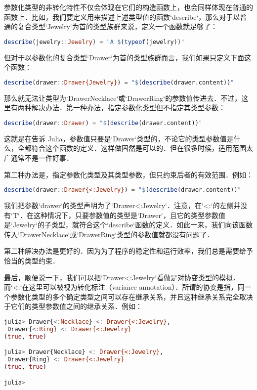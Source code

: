 参数化类型的非转化特性不仅会体现在它们的构造函数上，也会同样体现在普通的函数上．比如，我们要定义用来描述上述类型值的函数`describe`，那么对于以普通的复合类型`Jewelry`为首的类型族群来说，定义一个函数就足够了：

\begin{lstlisting}[language=julia]
describe(jewelry::Jewelry) = "A $(typeof(jewelry))"
\end{lstlisting}

但对于以参数化的复合类型`Drawer`为首的类型族群而言，我们如果只定义下面这个函数：

\begin{lstlisting}[language=julia]
describe(drawer::Drawer{Jewelry}) = "$(describe(drawer.content))"
\end{lstlisting}

那么就无法让类型为`Drawer{Necklace}`或`Drawer{Ring}`的参数值传进去．不过，这里有两种解决办法．第一种办法，指定参数化类型但不指定其类型参数：

\begin{lstlisting}[language=julia]
describe(drawer::Drawer) = "$(describe(drawer.content))"
\end{lstlisting}

这就是在告诉 Julia，参数值只要是`Drawer`类型的，不论它的类型参数值是什么，全都符合这个函数的定义．这样做固然是可以的．但在很多时候，适用范围太广通常不是一件好事．

第二种办法是，指定参数化类型及其类型参数，但只约束后者的有效范围．例如：

\begin{lstlisting}[language=julia]
describe(drawer::Drawer{<:Jewelry}) = "$(describe(drawer.content))"
\end{lstlisting}

我们把参数`drawer`的类型声明为了`Drawer{<:Jewelry}`．注意，在`<:`的左侧并没有`T`．在这种情况下，只要参数值的类型是`Drawer`，且它的类型参数值是`Jewelry`的子类型，就符合这个`describe`函数的定义．如此一来，我们向该函数传入`Drawer{Necklace}`或`Drawer{Ring}`类型的参数值就都没有问题了．

第二种解决办法是更好的．因为为了程序的稳定性和运行效率，我们总是需要给予恰当的类型约束．

最后，顺便说一下，我们可以把`Drawer{<:Jewelry}`看做是对协变类型的模拟．而`<:`在这里可以被视为转化标注（variance annotation）．所谓的协变是指，同一个参数化类型的多个确定类型之间可以存在继承关系，并且这种继承关系完全取决于它们的类型参数值之间的继承关系．例如：

\begin{lstlisting}[language=julia]
julia> Drawer{<:Necklace} <: Drawer{<:Jewelry},
 Drawer{<:Ring} <: Drawer{<:Jewelry}
(true, true)

julia> Drawer{Necklace} <: Drawer{<:Jewelry},
 Drawer{Ring} <: Drawer{<:Jewelry}
(true, true)

julia> 
\end{lstlisting}

